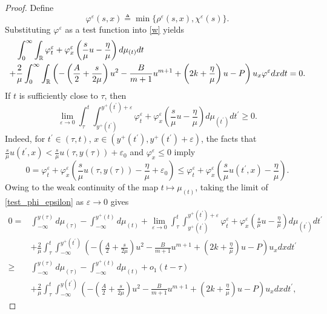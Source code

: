 \documentclass[10pt]{article}
\numberwithin{equation}{section}
\begin{document}
\begin{proof}
		Define 
		$$\varphi^\varepsilon(s,x)\triangleq\min\{\rho^\varepsilon(s,x),\chi^\varepsilon(s)\}.$$
		Substituting $\varphi^\varepsilon$ as a test function into \eqref{w} yields
		\begin{align}
			&\int_{0}^{\infty}\int_\mathbb{R}\varphi^\varepsilon_t+\varphi^\varepsilon_x\left(\frac{s}{\mu}u-\frac{\eta}{\mu}\right)d\mu_{(t)}dt\notag\\
			+&\frac{2}{\mu}\int_{0}^{\infty}\int_\mathbb{R}\left(-\left(\frac{A}{2}+\frac{s}{2\mu}\right)u^2-\frac{B}{m+1}u^{m+1}+\left(2k+\frac{\eta}{\mu}\right)u-P\right)u_x\varphi^\varepsilon dxdt=0.\label{test_phi_epsilon}
		\end{align}
		If $t$ is sufficiently close to $\tau$, then
		\begin{equation*}
			\lim_{\varepsilon\to0}\int_{\tau}^{t}\int_{y^{+}(t^\prime)}^{y^{+}(t^\prime)+\varepsilon}\varphi^\varepsilon_t+\varphi^\varepsilon_x\left(\frac{s}{\mu}u-\frac{\eta}{\mu}\right)d\mu_{(t^\prime)}dt^\prime\geq0.
		\end{equation*}
		Indeed, for $t^\prime\in(\tau,t)$, $x\in(y^{+}(t^\prime),y^{+}(t^\prime)+\varepsilon)$, the facts that $\frac{s}{\mu}u(t^\prime,x)<\frac{s}{\mu}u(\tau,y(\tau))+\varepsilon_0$ and $\varphi^\varepsilon_x\leq0$ imply
		$$
		0=\varphi^\varepsilon_t+\varphi^\varepsilon_x\left(\frac{s}{\mu}u(\tau,y(\tau))-\frac{\eta}{\mu}+\varepsilon_0\right)\leq \varphi^\varepsilon_t+\varphi^\varepsilon_x\left(\frac{s}{\mu}u(t^\prime,x)-\frac{\eta}{\mu}\right).
		$$
		Owing to the weak continuity of the map $t \mapsto \mu_{(t)}$, taking the limit of \eqref{test_phi_epsilon} as $\varepsilon\to0$ gives
		\begin{align*}
			0=
			&\int_{-\infty}^{y(\tau)}d\mu_{(\tau)}-\int_{-\infty}^{y^{+}(t)}d\mu_{(t)} +\lim_{\varepsilon\to0}\int_{\tau}^{t}\int_{y^{+}(t^\prime)}^{y^{+}(t^\prime)+\varepsilon}\varphi^\varepsilon_t+\varphi^\varepsilon_x\left(\frac{s}{\mu}u-\frac{\eta}{\mu}\right)d\mu_{(t^\prime)}dt^\prime \\
			& 
			+\frac{2}{\mu}\int_{\tau}^{t}\int_{-\infty}^{y^{+}(t^\prime)}\left(-\left(\frac{A}{2}+\frac{s}{2\mu}\right)u^2-\frac{B}{m+1}u^{m+1}+\left(2k+\frac{\eta}{\mu}\right)u-P\right)u_xdxdt^\prime \\
			\geq&\int_{-\infty}^{y(\tau)}d\mu_{(\tau)}-\int_{-\infty}^{y^{+}(t)}d\mu_{(t)}+o_1(t-\tau)\\
			& 
			+\frac{2}{\mu}\int_{\tau}^{t}\int_{-\infty}^{y(t^\prime)}\left(-\left(\frac{A}{2}+\frac{s}{2\mu}\right)u^2-\frac{B}{m+1}u^{m+1}+\left(2k+\frac{\eta}{\mu}\right)u-P\right)u_xdxdt^\prime,

\end{align*}
\end{proof}
\end{document}
